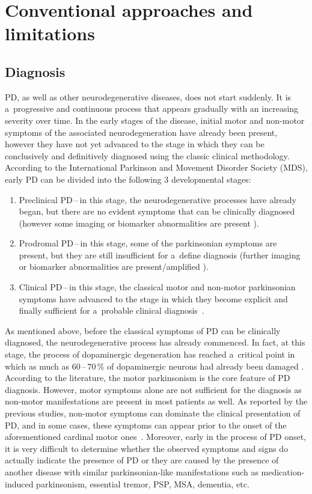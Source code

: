 \section{Conventional approaches and limitations}
\label{ch2_2}

\subsection{Diagnosis}
\label{ch1_2.1}

PD, as well as other neurodegenerative diseases, does not start suddenly. It is a~progressive and continuous process that appears gradually with an increasing severity over time. In the early stages of the disease, initial motor and non-motor symptoms of the associated neurodegeneration have already been present, however they have not yet advanced to the stage in which they can be conclusively and definitively diagnosed using the classic clinical methodology. According to the International Parkinson and Movement Disorder Society (MDS), early PD can be divided into the following $3$ developmental stages:
\begin{enumerate}
	\item Preclinical PD\,--\,in this stage, the neurodegenerative processes have already began, but there are no evident symptoms that can be clinically diagnosed (however some imaging or biomarker abnormalities are present \cite{Wu2011, Chahine2014}).
	\item Prodromal PD\,--\,in this stage, some of the parkinsonian symptoms are present, but they are still insufficient for a~define diagnosis (further imaging or biomarker abnormalities are present/amplified \cite{Stern2012, Berg2015}).
	\item Clinical PD\,--\,in this stage, the classical motor and non-motor parkinsonian symptoms have advanced to the stage in which they become explicit and finally sufficient for a~probable clinical diagnosis~\cite{Postuma2015}.
\end{enumerate}

As mentioned above, before the classical symptoms of PD can be clinically diagnosed, the neurodegenerative process has already commenced. In fact, at this stage, the process of dopaminergic degeneration has reached a~critical point in which as much as $60$\,--\,$70$\,\% of dopaminergic neurons had already been damaged \cite{RodriguezOrzo2009, Bernheimer1973}. According to the literature, the motor parkinsonism is the core feature of PD diagnosis. However, motor symptoms alone are not sufficient for the diagnosis as non-motor manifestations are present in most patients as well. As reported by the previous studies, non-motor symptoms can dominate the clinical presentation of PD, and in some cases, these symptoms can appear prior to the onset of the aforementioned cardinal motor ones~\cite{Postuma2012}. Moreover, early in the process of PD onset, it is very difficult to determine whether the observed symptoms and signs do actually indicate the presence of PD or they are caused by the presence of another disease with similar parkinsonian-like manifestations such as medication-induced parkinsonism, essential tremor, PSP, MSA, dementia, etc.

